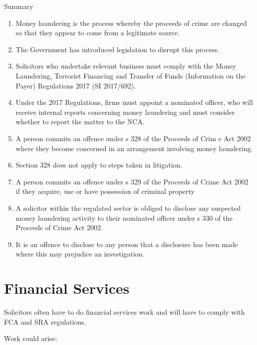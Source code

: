 \documentclass[
]{article}
\providecommand{\tightlist}{%
  \setlength{\itemsep}{0pt}\setlength{\parskip}{0pt}}
\newenvironment{env-a3cdf638-6f18-4b95-9378-c003a9523525}
{
    \savenotes\tcolorbox[blanker,breakable,left=5pt,borderline west={2pt}{-4pt}{blue}]
}
{
    \endtcolorbox\spewnotes
}
\begin{document}
\begin{env-a3cdf638-6f18-4b95-9378-c003a9523525}

Summary

\begin{enumerate}
\tightlist
\item
  Money laundering is the process whereby the proceeds of crime are
  changed so that they appear to come from a legitimate source.
\item
  The Government has introduced legislation to disrupt this process.
\item
  Solicitors who undertake relevant business must comply with the Money
  Laundering, Terrorist Financing and Transfer of Funds (Information on
  the Payer) Regulations 2017 (SI 2017/692).
\item
  Under the 2017 Regulations, firms must appoint a nominated officer,
  who will receive internal reports concerning money laundering and must
  consider whether to report the matter to the NCA.
\item
  A person commits an offence under s 328 of the Proceeds of Crim e Act
  2002 where they become concerned in an arrangement involving money
  laundering.
\item
  Section 328 does not apply to steps taken in litigation.
\item
  A person commits an offence under s 329 of the Proceeds of Crime Act
  2002 if they acquire, use or have possession of criminal property
\item
  A solicitor within the regulated sector is obliged to disclose any
  suspected money laundering activity to their nominated officer under s
  330 of the Proceeds of Crime Act 2002.
\item
  It is an offence to disclose to any person that a disclosure has been
  made where this may prejudice an investigation.
\end{enumerate}

\end{env-a3cdf638-6f18-4b95-9378-c003a9523525}

\hypertarget{financial-services}{%
\section{Financial Services}\label{financial-services}}

Solicitors often have to do financial services work and will have to
comply with FCA and SRA regulations.

Work could arise:
\end{document}
